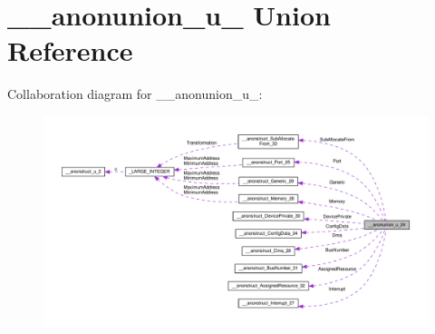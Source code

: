 \hypertarget{union____anonunion__u__24}{}\section{\+\_\+\+\_\+anonunion\+\_\+u\+\_ Union Reference}
\label{union____anonunion__u__24}


Collaboration diagram for \+\_\+\+\_\+anonunion\+\_\+u\+\_\+:
\nopagebreak
\begin{figure}[H]
\begin{center}
\leavevmode
\includegraphics[width=350pt]{union____anonunion__u__24__coll__graph}
\end{center}
\end{figure}
